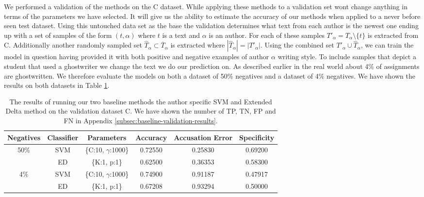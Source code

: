 We performed a validation of the methods on the \gls{C} dataset. While
applying these methods to a validation set wont change anything in terms of
the parameters we have selected. It will give us the ability to estimate the
accuracy of our methods when applied to a never before seen test dataset.
Using this untouched data set as the base the validation determines what text
from each author is the newest one ending up with a set of samples of the
form $(t, \alpha)$ where $t$ is a text and $\alpha$ is an author. For each
of these samples $T'_\alpha = T_\alpha \setminus \{t\}$ is extracted from
\gls{C}. Additionally another randomly sampled set $\hat{T}_\alpha \subset
\overline{T}_\alpha$ is extracted where $|\hat{T}_\alpha| = |T'_\alpha|$. Using
the combined set $T'_\alpha \cup \hat{T}_\alpha$, we can train the model in
question having provided it with both positive and negative examples of author
$\alpha$ writing style. To include samples that depict a student that used a
ghostwriter we change the text we do our prediction on. As described earlier in
the real world about 4\% of assignments are ghostwritten. We therefore evaluate
the models on both a dataset of 50\% negatives and a dataset of 4\% negatives.
We have shown the results on both datasets in Table \ref{tab:baseline-val-res}.

\begin{table}[h]
    \begin{adjustbox}{center}
    \scriptsize
    \begin{tabular}{|c|c|c||c|c|c|}
        \hline
        \textbf{Negatives} & \textbf{Classifier} & \textbf{Parameters} &
        \textbf{Accuracy} & \textbf{Accusation Error} & \textbf{Specificity} \\ \hline

        50\% & SVM & \{C:10, $\gamma$:1000\} & 0.72550 & 0.25830 & 0.69200 \\ \cline{2-6}

        & ED & \{K:1, p:1\} & 0.62500 & 0.36353 & 0.58300 \\ \hline

        4\%  & SVM & \{C:10, $\gamma$:1000\} & 0.74900 & 0.91187 & 0.47917 \\ \cline{2-6}

        & ED & \{K:1, p:1\} & 0.67208 & 0.93294 & 0.50000 \\ \hline
    \end{tabular}
    \end{adjustbox}
    \caption{The results of running our two baseline methods the author specific
        \gls{SVM} and Extended Delta method on the validation dataset \gls{C}.
        We have shown the number of \gls{TP}, \gls{TN}, \gls{FP} and \gls{FN} in
        Appendix \ref{subsec:baseline-validation-results}.}
    \label{tab:baseline-val-res}
\end{table}

